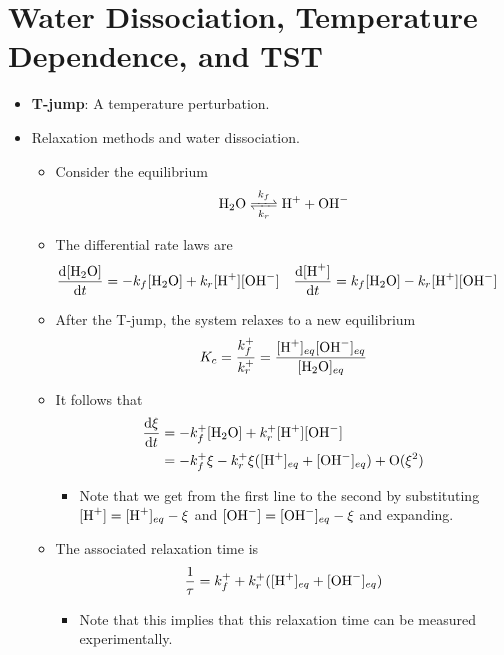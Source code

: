 \documentclass[../notes.tex]{subfiles}
\begin{document}
\section{Water Dissociation, Temperature Dependence, and TST}
\begin{itemize}
    \item {}\textbf{T-jump}: A temperature perturbation.
    \item Relaxation methods and water dissociation.
    \begin{itemize}
        \item Consider the equilibrium
        \begin{equation*}
            \ce{H2O <=>[$k_f$][$k_r$] H+ + OH-}
        \end{equation*}
        \item The differential rate laws are
        \begin{align*}
            \dv{[\ce{H2O}]}{t} &= -k_f[\ce{H2O}]+k_r[\ce{H+}][\ce{OH-}]&
            \dv{[\ce{H+}]}{t} &= k_f[\ce{H2O}]-k_r[\ce{H+}][\ce{OH-}]
        \end{align*}
        \item After the T-jump, the system relaxes to a new equilibrium
        \begin{equation*}
            K_c = \frac{k_f^+}{k_r^+}
            = \frac{[\ce{H+}]_{eq}[\ce{OH-}]_{eq}}{[\ce{H2O}]_{eq}}
        \end{equation*}
        \item It follows that
        \begin{align*}
            \dv{\xi}{t} &= -k_f^+[\ce{H2O}]+k_r^+[\ce{H+}][\ce{OH-}]\\
            &= -k_f^+\xi-k_r^+\xi([\ce{H+}]_{eq}+[\ce{OH-}]_{eq})+\text{O}(\xi^2)
        \end{align*}
        \begin{itemize}
            \item Note that we get from the first line to the second by substituting $[\ce{H+}]=[\ce{H+}]_{eq}-\xi$ and $[\ce{OH-}]=[\ce{OH-}]_{eq}-\xi$ and expanding.
        \end{itemize}
        \item The associated relaxation time is
        \begin{equation*}
            \frac{1}{\tau} = k_f^++k_r^+([\ce{H+}]_{eq}+[\ce{OH-}]_{eq})
        \end{equation*}
        \begin{itemize}
            \item Note that this implies that this relaxation time can be measured experimentally.

\end{itemize}
\end{itemize}
\end{itemize}
\end{document}
